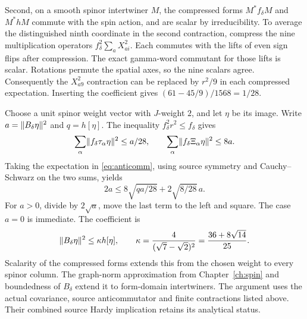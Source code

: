 Second, on a smooth spinor intertwiner $M$, the compressed forms $M^\ast f_\delta M$ and $M^\ast h M$ commute with the spin action, and are scalar by irreducibility. To average the distinguished ninth coordinate in the second contraction, compress the nine multiplication operators $f_\delta^2\sum_a X_{ai}^2$. Each commutes with the lifts of even sign flips after compression. The exact gamma-word commutant for those lifts is scalar. Rotations permute the spatial axes, so the nine scalars agree. Consequently the $X_{a9}^2$ contraction can be replaced by $r^2/9$ in each compressed expectation. Inserting the coefficient gives $(61-45/9)/1568=1/28$.

Choose a unit spinor weight vector with $J$-weight $2$, and let $\eta$ be its image. Write $a=\lVert B_\delta\eta\rVert^2$ and $q=h[\eta]$. The inequality $f_\delta^2r^2\le f_\delta$ gives
\[
 \sum_\alpha\lVert f_\delta\tau_\alpha\eta\rVert^2\le a/28,\qquad
 \sum_\alpha\lVert f_\delta\Xi_\alpha\eta\rVert^2\le 8a .
\]
Taking the expectation in \eqref{eq:anticomm}, using source symmetry and Cauchy--Schwarz on the two sums, yields
\[
 2a\le 8\sqrt{qa/28}+2\sqrt{8/28}\,a .
\]
For $a>0$, divide by $2\sqrt a$, move the last term to the left and square. The case $a=0$ is immediate. The coefficient is
\begin{equation}
 \lVert B_\delta\eta\rVert^2\le \kappa h[\eta],\qquad
 \kappa=\frac{4}{(\sqrt7-\sqrt2)^2}=\frac{36+8\sqrt{14}}{25}.
 \label{eq:hardy}
\end{equation}
Scalarity of the compressed forms extends this from the chosen weight to every spinor column. The graph-norm approximation from Chapter~\ref{ch:spin} and boundedness of $B_\delta$ extend it to form-domain intertwiners. The argument uses the actual covariance, source anticommutator and finite contractions listed above. Their combined source Hardy implication retains its analytical status.

